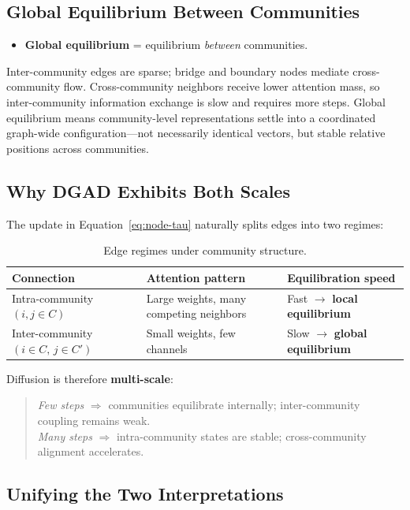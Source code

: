 \documentclass[11pt,a4paper]{report}
\begin{document}
\subsection{Global Equilibrium Between Communities}

\begin{itemize}[noitemsep]
    \item \textbf{Global equilibrium} = equilibrium \emph{between} communities.
\end{itemize}

Inter-community edges are sparse; bridge and boundary nodes mediate cross-community flow. Cross-community neighbors receive lower attention mass, so inter-community information exchange is slow and requires more steps. Global equilibrium means community-level representations settle into a coordinated graph-wide configuration---not necessarily identical vectors, but stable relative positions across communities.

\subsection{Why DGAD Exhibits Both Scales}

The update in Equation~\eqref{eq:node-tau} naturally splits edges into two regimes:

\begin{table}[h]
\centering
\caption{Edge regimes under community structure.}
\begin{tabular}{@{}lll@{}}
\toprule
\textbf{Connection} & \textbf{Attention pattern} & \textbf{Equilibration speed} \\
\midrule
Intra-community $(i,j \in C)$ & Large weights, many competing neighbors & Fast $\to$ \textbf{local equilibrium} \\
Inter-community $(i \in C,\, j \in C')$ & Small weights, few channels & Slow $\to$ \textbf{global equilibrium} \\
\bottomrule
\end{tabular}
\end{table}

Diffusion is therefore \textbf{multi-scale}:
\begin{quote}
\emph{Few steps} $\Rightarrow$ communities equilibrate internally; inter-community coupling remains weak.\\
\emph{Many steps} $\Rightarrow$ intra-community states are stable; cross-community alignment accelerates.
\end{quote}

\subsection{Unifying the Two Interpretations}
\end{document}

